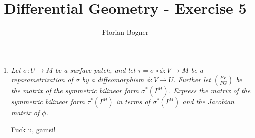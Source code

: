 \documentclass[a4paper,11pt,notitlepage,fullpage]{article}
\begin{document}
\author{Florian Bogner}
\title{Differential Geometry - Exercise 5}
\maketitle

\begin{enumerate}
\item \emph{Let $\sigma: U \to M$ be a surface patch, and let $\tau = \sigma \circ \phi: V \to M$ be a reparametrization of $\sigma$ by a diffeomorphism $\phi: V \to U$. Further let $\binom{EF}{FG}$ be the matrix of the symmetric bilinear form $\sigma^*(I^M)$. Express the matrix of the symmetric bilinear form $\tau^*(I^M)$ in terms of $\sigma^*(I^M)$ and the Jacobian matrix of $\phi$.}

Fuck u, gamsi!




\end{enumerate}
\end{document}
